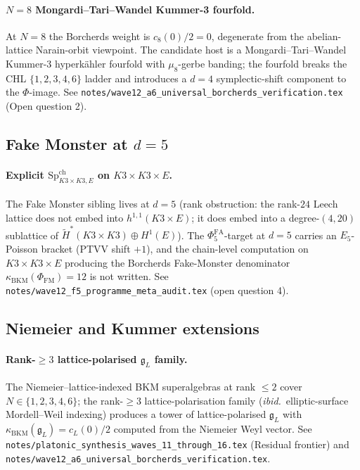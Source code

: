 \documentclass[11pt]{article}
\providecommand{\Sp}{\mathrm{Sp}}
\providecommand{\kBKM}{\kappa_{\mathrm{BKM}}}
\providecommand{\fg}{\mathfrak{g}}
\providecommand{\Phifa}{\Phi^{\mathrm{FA}}}
\begin{document}
\paragraph{$N = 8$ Mongardi--Tari--Wandel Kummer-3 fourfold.} At
$N = 8$ the Borcherds weight is $c_8(0)/2 = 0$, degenerate from the
abelian-lattice Narain-orbit viewpoint. The candidate host is a
Mongardi--Tari--Wandel Kummer-3 hyperk\"ahler fourfold with
$\mu_8$-gerbe banding; the fourfold breaks the CHL
$\{1, 2, 3, 4, 6\}$ ladder and introduces a $d = 4$ symplectic-shift
component to the $\Phi$-image. See
\texttt{notes/wave12\_a6\_universal\_borcherds\_verification.tex}
(Open question 2).

\subsection{Fake Monster at $d = 5$}

\paragraph{Explicit $\Sp^{\mathrm{ch}}_{K3 \times K3, E}$ on
$K3 \times K3 \times E$.} The Fake Monster sibling lives at $d = 5$
(rank obstruction: the rank-$24$ Leech lattice does not embed into
$h^{1, 1}(K3 \times E)$; it does embed into a degree-$(4, 20)$
sublattice of $\widetilde H^*(K3 \times K3) \oplus H^1(E)$). The
$\Phifa_5$-target at $d = 5$ carries an $E_5$-Poisson bracket
(PTVV shift $+1$), and the chain-level computation on
$K3 \times K3 \times E$ producing the Borcherds Fake-Monster denominator
$\kBKM(\Phi_{\mathrm{FM}}) = 12$ is not written. See
\texttt{notes/wave12\_f5\_programme\_meta\_audit.tex} (open
question 4).

\subsection{Niemeier and Kummer extensions}

\paragraph{Rank-$\geq 3$ lattice-polarised $\fg_L$ family.} The
Niemeier--lattice-indexed BKM superalgebras at rank $\leq 2$ cover
$N \in \{1, 2, 3, 4, 6\}$; the rank-$\geq 3$ lattice-polarisation
family (\emph{ibid.}\ elliptic-surface Mordell--Weil indexing)
produces a tower of lattice-polarised $\fg_L$ with
$\kBKM(\fg_L) = c_L(0)/2$ computed from the Niemeier Weyl vector.
See \texttt{notes/platonic\_synthesis\_waves\_11\_through\_16.tex}
(Residual frontier) and
\texttt{notes/wave12\_a6\_universal\_borcherds\_verification.tex}.
\end{document}
